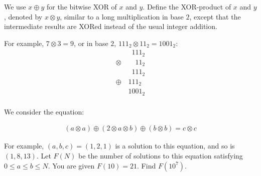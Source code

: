We use $x\oplus y$ for the bitwise XOR of $x$ and $y$.
Define the XOR-product of $x$ and $y$, denoted by $x \otimes y$, similar to a long multiplication in base $2$, except that the intermediate results are XORed instead of the usual integer addition.

For example, $7 \otimes 3 = 9$, or in base $2$, $111_2 \otimes 11_2 = 1001_2$:
$$\begin{align*}
\phantom{\otimes 111} 111_2 \\
\otimes \phantom{1111} 11_2 \\
\hline
\phantom{\otimes 111} 111_2 \\
\oplus \phantom{11} 111_2  \phantom{9} \\
\hline
\phantom{\otimes 11} 1001_2 \\
\end{align*}
$$

We consider the equation:

$$\begin{align*}
(a \otimes a) \oplus (2 \otimes a \otimes b) \oplus (b \otimes b) = c \otimes c
\end{align*}
$$

For example, $(a, b, c) = (1, 2, 1)$ is a solution to this equation, and so is $(1, 8, 13)$.
Let $F(N)$ be the number of solutions to this equation satisfying $0 \le a \le b \le N$. You are given $F(10)=21$.
Find $F(10^7)$.
